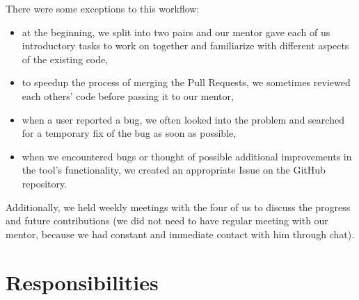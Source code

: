 \documentclass[licencjacka,en]{pracamgr}
\begin{document}
There were some exceptions to this workflow:
\begin{itemize}
	\item at the beginning, we split into two pairs and our mentor gave each of us introductory
		tasks to work on together and familiarize with different aspects of the existing code,
	\item to speedup the process of merging the Pull Requests, we sometimes reviewed each others'
		code before passing it to our mentor,
	\item when a user reported a bug, we often looked into the problem and searched for a temporary
		fix of the bug as soon as possible,
	\item when we encountered bugs or thought of possible additional improvements in the tool's
		functionality, we created an appropriate Issue on the GitHub repository.
\end{itemize}

Additionally, we held weekly meetings with the four of us to discuss the progress and future
contributions (we did not need to have regular meeting with our mentor, because we had constant
and immediate contact with him through chat).

\section{Responsibilities}\label{r:section_responsibilities}
\end{document}
